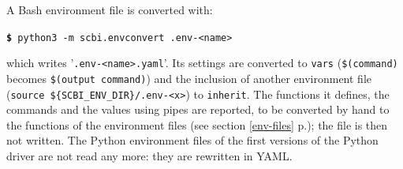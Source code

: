 \documentclass[a4paper,12pt,twoside]{article}
\newcommand{\code}[1]{\texttt{#1}}
\newcommand{\seeref}[1]{see section \ref{#1} p.\pageref{#1}}
\newcommand{\file}[1]{'{\texttt{#1}}'}
\newcommand{\cmd}[1]{\tabto{1cm}\hspace{0.5cm}\texttt{\textbf{\$} #1}}
\begin{document}
A Bash environment file is converted with:

\cmd{python3 -m scbi.envconvert .env-<name>}

which writes \file{.env-<name>.yaml}. Its settings are converted to
\code{vars} (\code{\$(command)} becomes \code{\$(output command)}) and the
inclusion of another environment file (\code{source
\$\{SCBI\_ENV\_DIR\}/.env-<x>}) to \code{inherit}. The functions it
defines, the commands and the values using pipes are reported, to be
converted by hand to the functions of the environment files
(\seeref{env-files}); the file is then not written. The Python
environment files of the first versions of the Python driver are not
read any more: they are rewritten in YAML.

\printindex

\end{document}

